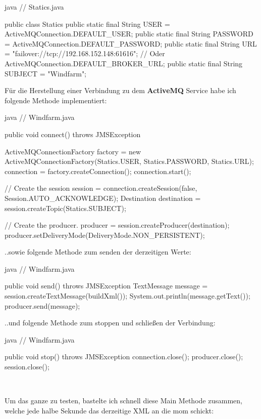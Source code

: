 \begin{code}{java}
// Statics.java

public class Statics {
    public static final String USER = ActiveMQConnection.DEFAULT_USER;
    public static final String PASSWORD = ActiveMQConnection.DEFAULT_PASSWORD;
    public static final String URL = "failover://tcp://192.168.152.148:61616"; // Oder ActiveMQConnection.DEFAULT_BROKER_URL;
    public static final String SUBJECT = "Windfarm";
}
\end{code}

Für die Herstellung einer Verbindung zu dem \textbf{ActiveMQ} Service habe ich folgende Methode implementiert:

\begin{code}{java}
// Windfarm.java

public void connect() throws JMSException {
    ActiveMQConnectionFactory factory = new ActiveMQConnectionFactory(Statics.USER, Statics.PASSWORD, Statics.URL);
    connection = factory.createConnection();
    connection.start();

    // Create the session
    session = connection.createSession(false, Session.AUTO_ACKNOWLEDGE);
    Destination destination = session.createTopic(Statics.SUBJECT);

    // Create the producer.
    producer = session.createProducer(destination);
    producer.setDeliveryMode(DeliveryMode.NON_PERSISTENT);
}
\end{code}

..sowie folgende Methode zum senden der derzeitigen Werte:

\begin{code}{java}
// Windfarm.java

public void send() throws JMSException {
    TextMessage message = session.createTextMessage(buildXml());
    System.out.println(message.getText());
    producer.send(message);
}
\end{code}

..und folgende Methode zum stoppen und schließen der Verbindung:

\begin{code}{java}
// Windfarm.java

public void stop() throws JMSException {
    connection.close();
    producer.close();
    session.close();
}
\end{code}

\

Um das ganze zu testen, bastelte ich schnell diese Main Methode zusammen, welche jede halbe Sekunde das derzeitige XML an die \gls{mom} schickt:

